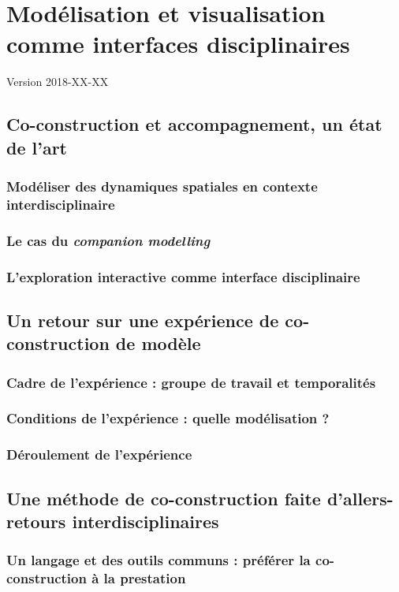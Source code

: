 \chapter{Modélisation et visualisation comme interfaces disciplinaires}
\begin{center}
	{\large Version 2018-XX-XX}	\end{center}
\minitoc

\section{Co-construction et accompagnement, un état de l'art}
\subsection{Modéliser des dynamiques spatiales en contexte interdisciplinaire}
\subsection{Le cas du \textit{companion modelling}}
\subsection{L'exploration interactive comme interface disciplinaire}

\section{Un retour sur une expérience de co-construction de modèle}
\subsection{Cadre de l'expérience : groupe de travail et temporalités}
\subsection{Conditions de l'expérience : quelle modélisation ?}
\subsection{Déroulement de l'expérience}

\section{Une méthode de co-construction faite d'allers-retours interdisciplinaires}
\subsection{Un langage et des outils communs : préférer la co-construction à la prestation}
